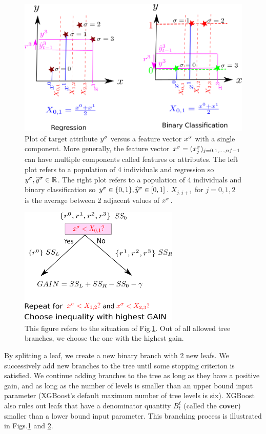 \begin{figure}[h!]
\centering
\includegraphics[width=6in]
{xgboost/xgb-partitions.png}
\caption{Plot of
target attribute $y^\sigma$ 
versus a feature
vector $x^\sigma$
with a single component.
More generally, 
the feature vector 
 $x^\sigma=(x^\sigma_j)_
{j=0,1, \ldots, nf-1}$
can have multiple components
called features or attributes.
The left plot
refers to a population 
of 4 individuals and regression
so $y^\sigma, {\widehat{y}}^\sigma\in { \mathbb{R}}$.
The right plot 
refers to a population 
of 4 individuals and binary classification
so $y^\sigma\in\{0,1\}, {\widehat{y}}^\sigma\in [0,1]$.
$X_{j,j+1}$ for $j=0,1,2$ is
the average between 2 
adjacent values of $x^\sigma$.
 } 
\label{fig-xgb-partitions}
\end{figure}

\begin{figure}[h!]
\centering
\includegraphics[width=3in]
{xgboost/xgb-splitting.png}
\caption{This 
figure refers to the situation of 
 Fig.\ref{fig-xgb-partitions}.
Out of all
allowed tree branches, we 
choose the one with the highest gain.
 } 
\label{fig-xgb-splitting}
\end{figure}

By splitting a leaf,
we create a new binary branch
with 2 new leafs.
We successively add new 
branches to the tree until
some stopping criterion is satisfied.
We continue adding branches to the tree
as long as they have a positive gain,
and 
as long as the number of levels is smaller
than an upper bound input parameter (XGBoost's default 
maximum number of tree levels is six).
XGBoost also rules out leafs
that have a denominator quantity
 $B^\ell_t$ (called the {\bf cover})
smaller than a lower bound  input parameter.
This branching 
process
is illustrated
in Figs.\ref{fig-xgb-partitions}
and \ref{fig-xgb-splitting}.



